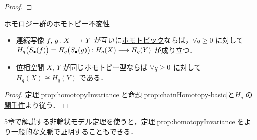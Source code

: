 \documentclass[algtopo_main]{subfiles}
\begin{document}
\begin{proof}
    
\end{proof}

\begin{mycol}[label=col:homotopyInvariance]{ホモロジー群のホモトピー不変性}
    \begin{itemize}
        \item 連続写像 $f,\, g \colon X \longrightarrow Y$ が互いに\hyperref[def:homotopic]{ホモトピック}ならば，$\forall q \ge 0$ に対して $H_q\bigl(S_\bullet(f)\bigr) = H_q\bigl(S_\bullet(g)\bigr) \colon H_q(X) \longrightarrow H_q(Y)$ が成り立つ．
        \item 位相空間 $X,\, Y$ が\hyperref[def:homotopic]{同じホモトピー型}ならば $\forall q \ge 0$ に対して $H_q(X) \cong H_q(Y)$ である．
    \end{itemize}
\end{mycol}

\begin{proof}
    定理\ref{prop:homotopyInvariance}と命題\ref{prop:chainHomotopy-basic}と\hyperref[prop:Hq-functoriality]{$H_q$ の関手性}より従う．
\end{proof}

5章で解説する非輪状モデル定理を使うと，定理\ref{prop:homotopyInvariance}をより一般的な文脈で証明することもできる．
\end{document}
